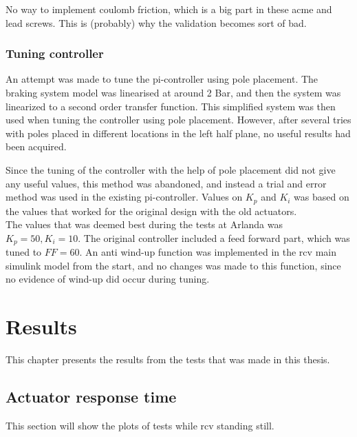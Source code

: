 \documentclass[a4paper,11pt]{kth-mag}
\begin{document}
No way to implement coulomb friction, which is a big part in these acme and lead screws. This is (probably) why the validation becomes sort of bad.\\



\subsection{Tuning controller}
An attempt was made to tune the \gls{pi}-controller using pole placement. The braking system model was linearised at around 2 Bar, and then the system was linearized to a second order transfer function. This simplified system was then used when tuning the controller using pole placement. However, after several tries with poles placed in different locations in the left half plane, no useful results had been acquired. 

Since the tuning of the controller with the help of pole placement did not give any useful values, this method was abandoned, and instead a trial and error method was used in the existing \gls{pi}-controller. Values on \begin{math} K_{p}\end{math} and \begin{math} K_{i} \end{math} was based on the values that worked for the original design with the old actuators.\\ 


The values that was deemed best during the tests at Arlanda was \begin{math} K_{p}=50,K_i=10 \end{math}. The original controller included a feed forward part, which was tuned to  \begin{math} FF = 60 \end{math}. 
An anti wind-up function was implemented in the \gls{rcv} main simulink model from the start, and no changes was made to this function, since no evidence of wind-up did occur during tuning. \\




\chapter{Results}
This chapter presents the results from the tests that was made in this thesis.

\section{Actuator response time}
This section will show the plots of tests while \gls{rcv} standing still. 
\end{document}
